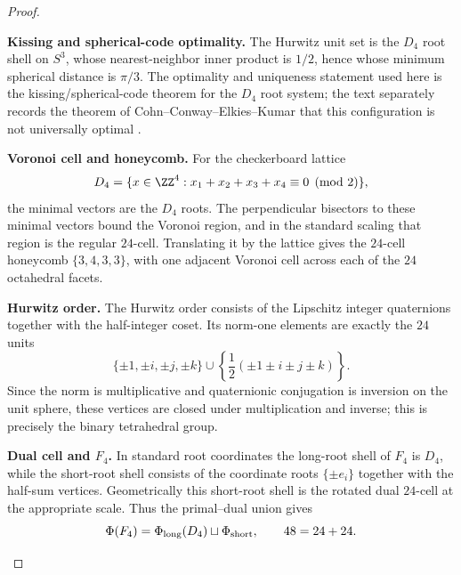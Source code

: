 \documentclass[11pt]{article}
\begin{document}
\begin{proof}

\begin{proofsteps}[label=\textbf{(\roman*)}]
\item \textbf{Kissing and spherical-code optimality.}
The Hurwitz unit set is the \(D_4\) root shell on \(S^3\), whose nearest-neighbor inner product is \(1/2\), hence whose minimum spherical distance is \(\pi/3\).  The optimality and uniqueness statement used here is the kissing/spherical-code theorem for the \(D_4\) root system; the text separately records the theorem of Cohn--Conway--Elkies--Kumar that this configuration is not universally optimal \cite{CohnConwayElkiesKumar2007,deLaatLeijenhorstDeMuinckKeizer2024}.

\item \textbf{Voronoi cell and honeycomb.}
For the checkerboard lattice
\[
D_4=\{x\in\ZZ^4:x_1+x_2+x_3+x_4\equiv0\pmod2\},
\]
the minimal vectors are the \(D_4\) roots.  The perpendicular bisectors to these minimal vectors bound the Voronoi region, and in the standard scaling that region is the regular \(24\)-cell.  Translating it by the lattice gives the \(24\)-cell honeycomb \(\{3,4,3,3\}\), with one adjacent Voronoi cell across each of the \(24\) octahedral facets.

\item \textbf{Hurwitz order.}
The Hurwitz order consists of the Lipschitz integer quaternions together with the half-integer coset.  Its norm-one elements are exactly the \(24\) units
\[
\{\pm1,\pm i,\pm j,\pm k\}
\cup
\left\{\frac12(\pm1\pm i\pm j\pm k)\right\}.
\]
Since the norm is multiplicative and quaternionic conjugation is inversion on the unit sphere, these vertices are closed under multiplication and inverse; this is precisely the binary tetrahedral group.

\item \textbf{Dual cell and \(F_4\).}
In standard root coordinates the long-root shell of \(F_4\) is \(D_4\), while the short-root shell consists of the coordinate roots \(\{\pm e_i\}\) together with the half-sum vertices.  Geometrically this short-root shell is the rotated dual \(24\)-cell at the appropriate scale.  Thus the primal--dual union gives
\[
\Phi(F_4)=\Phi_{\rm long}(D_4)\sqcup\Phi_{\rm short},
\qquad
48=24+24.
\]


\end{proofsteps}
\end{proof}
\end{document}
